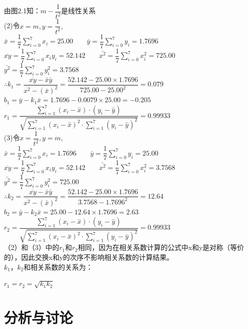 \documentclass{article}
\begin{document}
由图2.1知：$m-\dfrac{1}{t^2}$是线性关系\\
(2)令$x=m,y=\dfrac{1}{t^2},$\\
$\bar{x}=\dfrac{1}{7} \sum_{i=0}^7 x_i=25.00\qquad$\quad$\bar{y}=\dfrac{1}{7} \sum_{i=0}^7 y_i=1.7696$\\
$\overline{xy}=\dfrac{1}{7} \sum_{i=0}^{7} x_iy_i=52.142 \qquad \bar{x^2}=\dfrac{1}{7} \sum_{i=0}^{7} x_i^2=725.00$\\$\bar{y^2}=\dfrac{1}{7} \sum_{i=0}^{7} y_i^2=3.7568$\\
$\therefore k_1=\dfrac{\overline{xy}-\bar{x}\bar{y}}{\overline{x^2}-(\bar{x})^2}= \dfrac{52.142-25.00\times1.7696}{725.00-25.00^2}=0.079$\\
$b_1=\bar{y}-k_1\bar{x}=1.7696-0.0079\times25.00=-0.205$\\
$ r_1 = \dfrac{\sum _{i=1}^{7}(x_{i} - \stackrel{-}{x})\cdot(y_{i} - \stackrel{-}{y})}{\sqrt{\sum _{i=1}^{7}(x_{i} - \stackrel{-}{x})^{2} \cdot \sum _{i=1}^{7}(y_{i} - \stackrel{-}{y})^{2}}} = 0.99933 $\\
(3)令$x=\dfrac{1}{t^2},y=m,$\\
$\bar{x}=\dfrac{1}{7} \sum_{i=0}^7 x_i=1.7696\qquad$\quad$\bar{y}=\dfrac{1}{7} \sum_{i=0}^7 y_i=25.00$\\
$\overline{xy}=\dfrac{1}{7} \sum_{i=0}^{7} x_iy_i=52.142 \qquad \bar{x^2}=\dfrac{1}{7} \sum_{i=0}^{7} x_i^2=3.7568$\\$\bar{y^2}=\dfrac{1}{7} \sum_{i=0}^{7} y_i^2=725.00$\\
$\therefore k_2=\dfrac{\overline{xy}-\bar{x}\bar{y}}{\overline{x^2}-(\bar{x})^2}= \dfrac{52.142-25.00\times1.7696}{3.7568-1.7696^2}=12.64$\\
$b_2=\bar{y}-k_2\bar{x}=25.00-12.64\times1.7696=2.63$\\
$ r_2 = \dfrac{\sum _{i=1}^{7}(x_{i} - \stackrel{-}{x})\cdot(y_{i} - \stackrel{-}{y})}{\sqrt{\sum _{i=1}^{7}(x_{i} - \stackrel{-}{x})^{2} \cdot \sum _{i=1}^{7}(y_{i} - \stackrel{-}{y})^{2}}} = 0.99933 $\\

（2）和（3）中的$r_1$和$r_2$相同，因为在相关系数计算的公式中x和y是对称（等价的），因此交换x和y的次序不影响相关系数的计算结果。\\
$k_1，k_2$和相关系数的关系为：\\
\centerline{ $r_1=r_2=\sqrt{k_1k_2}$}

\chapter{分析与讨论}
\end{document}
